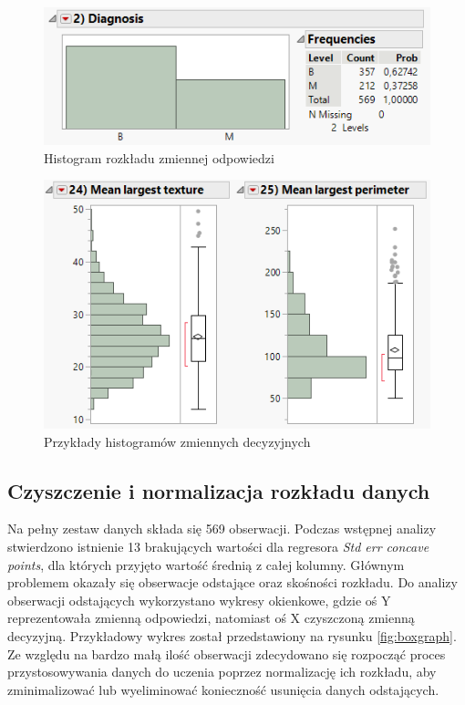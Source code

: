 	\begin{figure}[!ht]
		\centering
		\includegraphics[width=0.6\linewidth]{Rysunki/Rozdzial2/diagnosis_distribution}
		\caption{Histogram rozkładu zmiennej odpowiedzi}
		\label{fig:diagnosisdistribution}
	\end{figure}
	
	\begin{figure}[!ht]
		\centering
		\includegraphics[width=0.6\linewidth]{Rysunki/Rozdzial2/variable_distribution}
		\caption{Przykłady histogramów zmiennych decyzyjnych}
		\label{fig:variabledistribution}
	\end{figure}
	
	
	\subsection{Czyszczenie i normalizacja rozkładu danych}
	
	Na pełny zestaw danych składa się 569 obserwacji. Podczas wstępnej analizy stwierdzono istnienie 13 brakujących wartości dla regresora \textit{Std err concave points}, dla których przyjęto wartość średnią z całej kolumny. Głównym problemem okazały się obserwacje odstające oraz skośności rozkładu. Do analizy obserwacji odstających wykorzystano wykresy okienkowe, gdzie oś Y reprezentowała zmienną odpowiedzi, natomiast oś X czyszczoną zmienną decyzyjną. Przykładowy wykres został przedstawiony na rysunku \ref{fig:boxgraph}. Ze względu na bardzo małą ilość obserwacji zdecydowano się rozpocząć proces przystosowywania danych do uczenia poprzez normalizację ich rozkładu, aby zminimalizować lub wyeliminować konieczność usunięcia danych odstających. 
	
